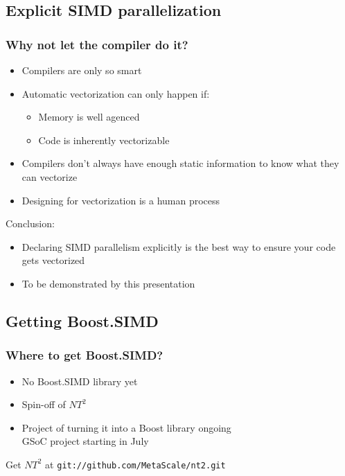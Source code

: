 \documentclass{beamer}
\begin{document}
\subsection{Explicit SIMD parallelization}
\begin{frame}
	\frametitle{Why not let the compiler do it?}
	
	\begin{itemize}
		\item Compilers are only so smart
		\item Automatic vectorization can only happen if:
		\begin{itemize}
			\item Memory is well agenced
			\item Code is inherently vectorizable
		\end{itemize}
	\end{itemize}
	
	\begin{itemize}
		\item Compilers don't always have enough static information to know what they can vectorize
		\item Designing for vectorization is a human process
	\end{itemize}
	
	Conclusion:
	\begin{itemize}
		\item Declaring SIMD parallelism explicitly is the best way
              to ensure your code gets vectorized
        \item To be demonstrated by this presentation
    \end{itemize}

\end{frame}

\subsection{Getting Boost.SIMD}
\begin{frame}
	\frametitle{Where to get Boost.SIMD?}
	
	\begin{itemize}
		\item No Boost.SIMD library yet
		\item Spin-off of $NT^2$
		\item Project of turning it into a Boost library ongoing\\
		      GSoC project starting in July
    \end{itemize}
	\bigskip	
	
	Get $NT^2$ at \texttt{git://github.com/MetaScale/nt2.git}
	
\end{frame}
\end{document}
